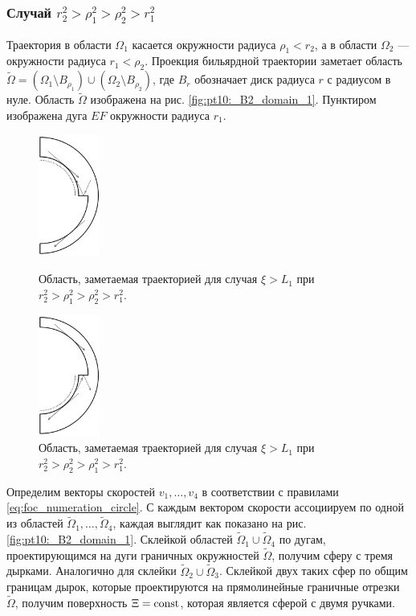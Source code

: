 \subsubsection{Случай $r_2^2 > \rho_1^2 > \rho_2^2 > r_1^2$}\label{sec:ch4/sec3/subsec9/subsec1}
Траектория в области $\Omega_1$ касается окружности радиуса $\rho_1 < r_2$, а в области $\Omega_2$ --- окружности радиуса $r_1 < \rho_2$. Проекция бильярдной траектории заметает область $\widetilde{\Omega} = (\Omega_1 \setminus B_{\rho_1}) \cup (\Omega_2 \setminus B_{\rho_2})$, где $B_r$ обозначает диск радиуса $r$ с радиусом в нуле. Область $\widetilde{\Omega}$ изображена на рис. \ref{fig:pt10:_B2_domain_1}. Пунктиром изображена дуга $EF$ окружности радиуса $r_1$. 
\begin{figure}[!htb]
\centering
\includegraphics[width=2cm]{images/ch4/section3_circular/atoms/sect3_B2_domain_1.pdf}
    \caption{Область, заметаемая траекторией для случая $\xi > L_1$ при $r_2^2 > \rho_1^2 > \rho_2^2 > r_1^2$.}
    \label{fig:pt10:_B2_domain_1}
\endminipage\hfill
{}
\centering
\includegraphics[width=2cm]{images/ch4/section3_circular/atoms/sect3_B2_domain_2.pdf}
    \caption{Область, заметаемая траекторией для случая $\xi > L_1$ при $r_2^2 > \rho_2^2 > \rho_1^2 > r_1^2$.}
        \label{fig:pt10:_B2_domain_2}
\endminipage\hfill
\end{figure}

Определим векторы скоростей $v_1, \ldots, v_4$ в соответствии с правилами \eqref{eq:foc_numeration_circle}. С каждым вектором скорости ассоциируем по одной из областей $\widetilde{\Omega}_1, \ldots, \widetilde{\Omega}_4$, каждая выглядит как показано на  рис. \ref{fig:pt10:_B2_domain_1}. 
Склейкой областей $\widetilde{\Omega}_1 \cup \widetilde{\Omega}_4$ по дугам, проектирующимся на дуги граничных окружностей $\widetilde{\Omega}$, получим сферу с тремя дырками. Аналогично для склейки $\widetilde{\Omega}_2 \cup \widetilde{\Omega}_3$. Склейкой двух таких сфер по общим границам дырок, которые проектируются на прямолинейные граничные отрезки $\widetilde{\Omega}$, получим поверхность $\Xi=\mathrm{const}$, которая является сферой с двумя ручками. 

